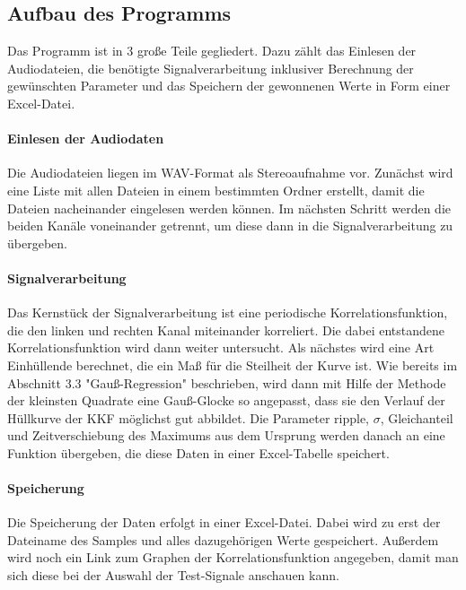 \subsection{Aufbau des Programms}
Das Programm ist in 3 große Teile gegliedert. Dazu zählt das Einlesen der Audiodateien, die benötigte Signalverarbeitung inklusiver Berechnung der gewünschten Parameter und das Speichern der gewonnenen Werte in Form einer Excel-Datei.
\paragraph{Einlesen der Audiodaten}
Die Audiodateien liegen im WAV-Format als Stereoaufnahme vor. Zunächst wird eine Liste mit allen Dateien in einem bestimmten Ordner erstellt, damit die Dateien nacheinander eingelesen werden können. Im nächsten Schritt werden die beiden Kanäle voneinander getrennt, um diese dann in die Signalverarbeitung zu übergeben.
\paragraph{Signalverarbeitung}
Das Kernstück der Signalverarbeitung ist eine periodische Korrelationsfunktion, die den linken und rechten Kanal miteinander korreliert. Die dabei entstandene Korrelationsfunktion wird dann weiter untersucht. Als nächstes wird eine Art Einhüllende berechnet, die ein Maß für die Steilheit der Kurve ist. Wie bereits im Abschnitt 3.3 "Gauß-Regression" beschrieben, wird dann mit Hilfe der Methode der kleinsten Quadrate eine Gauß-Glocke so angepasst, dass sie den Verlauf der Hüllkurve der KKF möglichst gut abbildet. Die Parameter ripple, $\sigma$, Gleichanteil und Zeitverschiebung des Maximums aus dem Ursprung werden danach an eine Funktion übergeben, die diese Daten in einer Excel-Tabelle speichert.
\paragraph{Speicherung}
Die Speicherung der Daten erfolgt in einer Excel-Datei. Dabei wird zu erst der Dateiname des Samples und alles dazugehörigen Werte gespeichert. Außerdem wird noch ein Link zum Graphen der Korrelationsfunktion angegeben, damit man sich diese bei der Auswahl der Test-Signale anschauen kann.

